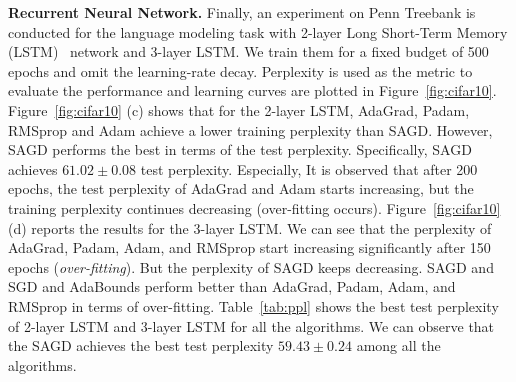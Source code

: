 \documentclass[11pt]{article}
\begin{document}
\textbf{Recurrent Neural Network.}
Finally, an experiment on Penn Treebank is conducted for the language modeling task with 2-layer Long Short-Term Memory (LSTM)~\citep{stni2018} network and 3-layer LSTM. We train them for a fixed budget of 500 epochs and omit the learning-rate decay. Perplexity is used as the metric to evaluate the performance and learning curves are plotted in Figure~\ref{fig:cifar10}. 
Figure~\ref{fig:cifar10} (c) shows that for the 2-layer LSTM, AdaGrad, Padam, RMSprop and Adam achieve a lower training perplexity than \textsc{SAGD}. However, \textsc{SAGD} performs the best in terms of the test perplexity. Specifically, \textsc{SAGD} achieves $61.02 \pm 0.08$ test perplexity. 
Especially, It is observed that after 200 epochs, the test perplexity of AdaGrad and Adam starts increasing, but the training perplexity continues decreasing (over-fitting occurs).  
Figure~\ref{fig:cifar10} (d) reports the results for the 3-layer LSTM. We can see that the perplexity of AdaGrad, Padam, Adam, and RMSprop start increasing significantly after 150 epochs (\emph{over-fitting}). But the perplexity of \textsc{SAGD} keeps decreasing. \textsc{SAGD} and SGD and AdaBounds perform better than AdaGrad, Padam, Adam, and RMSprop in terms of over-fitting.
Table~\ref{tab:ppl} shows the best test perplexity of 2-layer LSTM and 3-layer LSTM for all the algorithms. We can observe that the \textsc{SAGD} achieves the best test perplexity $59.43 \pm 0.24$ among all the algorithms. 

\begin{table}[H]
\small
\caption{ Test Perplexity of LSTMs on Penn Treebank. Bold number indicates the best result.}\label{tab:ppl}
	\vspace{-0.1in}
\end{table}


\vspace{-0.05in}
\end{document}
